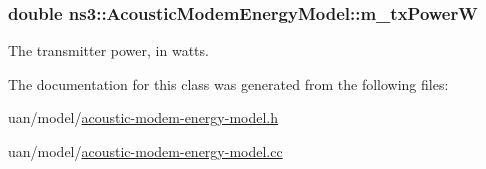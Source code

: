 \subsubsection[{\texorpdfstring{m\+\_\+tx\+PowerW}{m_txPowerW}}]{\setlength{\rightskip}{0pt plus 5cm}double ns3\+::\+Acoustic\+Modem\+Energy\+Model\+::m\+\_\+tx\+PowerW\hspace{0.3cm}{\ttfamily [private]}}\hypertarget{classns3_1_1AcousticModemEnergyModel_a39960d270366b5ff4a83d32c077b44a2}{}\label{classns3_1_1AcousticModemEnergyModel_a39960d270366b5ff4a83d32c077b44a2}


The transmitter power, in watts. 



The documentation for this class was generated from the following files\+:\begin{DoxyCompactItemize}
\item 
uan/model/\hyperlink{acoustic-modem-energy-model_8h}{acoustic-\/modem-\/energy-\/model.\+h}\item 
uan/model/\hyperlink{acoustic-modem-energy-model_8cc}{acoustic-\/modem-\/energy-\/model.\+cc}\end{DoxyCompactItemize}

